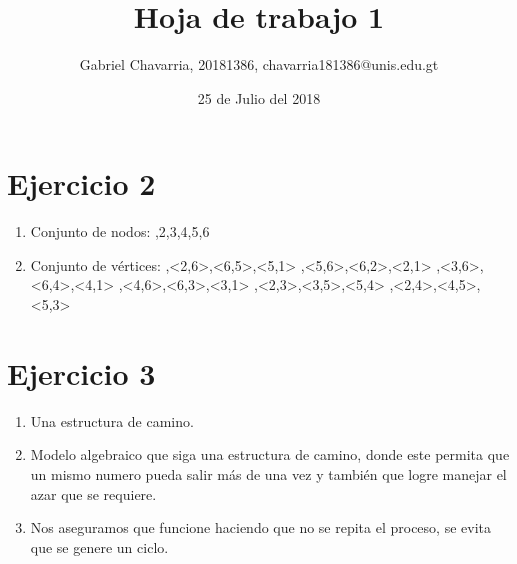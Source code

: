 \documentclass{article}
\begin{document}
\title{Hoja de trabajo 1}
\author{Gabriel Chavarria, 20181386, chavarria181386@unis.edu.gt}
\date{25 de Julio del 2018}

\maketitle

\section{Ejercicio 2}
\begin{enumerate}
        \item{ Conjunto de nodos: \left{},2,3,4,5,6\right\rbrace}
        
       
        
        \item{Conjunto de vértices:         \newline\left{},<2,6>,<6,5>,<5,1>\right\rbrace 
        \newline\left{},<5,6>,<6,2>,<2,1>\right\rbrace 
        \newline\left{},<3,6>,<6,4>,<4,1>\right\rbrace 
        \newline\left{},<4,6>,<6,3>,<3,1>\right\rbrace 
        \newline\left{},<2,3>,<3,5>,<5,4>\right\rbrace 
        \newline \left{},<2,4>,<4,5>,<5,3> \right\rbrace  
        
        }
        
         \end{enumerate}        
                


\section{Ejercicio 3}
\begin{enumerate}
        \item{ Una estructura de camino.}
        \item{Modelo algebraico que siga una estructura de camino, donde este permita que un mismo numero pueda salir más de  una vez y también que logre manejar el azar que se requiere.  }
        \item{Nos aseguramos que funcione haciendo que no se repita el proceso, se evita que se genere un ciclo. }
                
\end{enumerate}
\end{document}
